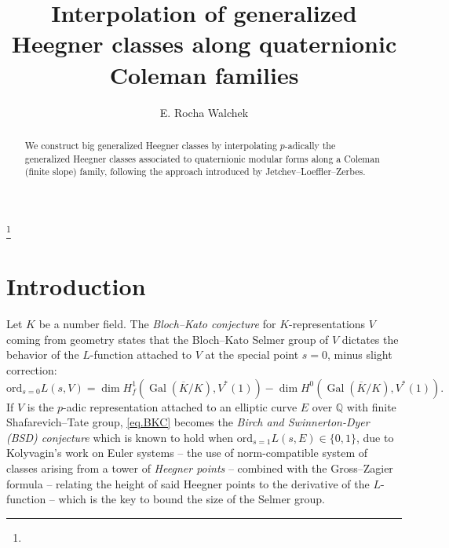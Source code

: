 \documentclass[a4paper]{amsart}
\numberwithin{equation}{section}
\theoremstyle{definition}
\newcommand{\Q}{\mathbb{Q}}
\DeclareMathOperator{\Gal}{Gal}
\newcommand{\ord}{\mathrm{ord}}
\begin{document}
\title{Interpolation of generalized Heegner classes along quaternionic Coleman families}
\date{}
\author{E. Rocha Walchek}
\thanks{}

\begin{abstract}
We construct big generalized Heegner classes by interpolating $p$-adically the generalized Heegner classes associated to quaternionic modular forms along a Coleman (finite slope) family, following the approach introduced by Jetchev--Loeffler--Zerbes.
\end{abstract}

\address{Facultad de Ciencias, Universidad de la República, Iguá 4225, 11400 Montevideo, Uruguay}


\maketitle

\section{Introduction}\label{sec.Introduction}

Let $K$ be a number field. The \textit{Bloch--Kato conjecture} for $K$-representations $V$ coming from geometry states that the Bloch--Kato Selmer group of $V$ dictates the behavior of the $L$-function attached to $V$ at the special point $s=0$, minus slight correction: 
\begin{equation}\label{eq.BKC}
\ord_{s=0}L(s,V)=\dim H^1_f(\Gal(\overline{K}/K),V^*(1))-\dim H^0(\Gal(\overline{K}/K),V^*(1)).
\end{equation}
If $V$ is the $p$-adic representation attached to an elliptic curve $E$ over $\Q$ with finite Shafarevich--Tate group, \eqref{eq.BKC} becomes the \textit{Birch and Swinnerton-Dyer (BSD) conjecture} which is known to hold when $\ord_{s=1}L(s,E)\in\{0,1\}$, due to Kolyvagin's work on Euler systems \cite{Kolyvagin} -- the use of norm-compatible system of classes arising from a tower of \textit{Heegner points} -- combined with the Gross--Zagier formula \cite{GrossZagier} -- relating the height of said Heegner points to the derivative of the $L$-function -- which is the key to bound the size of the Selmer group.
\end{document}
